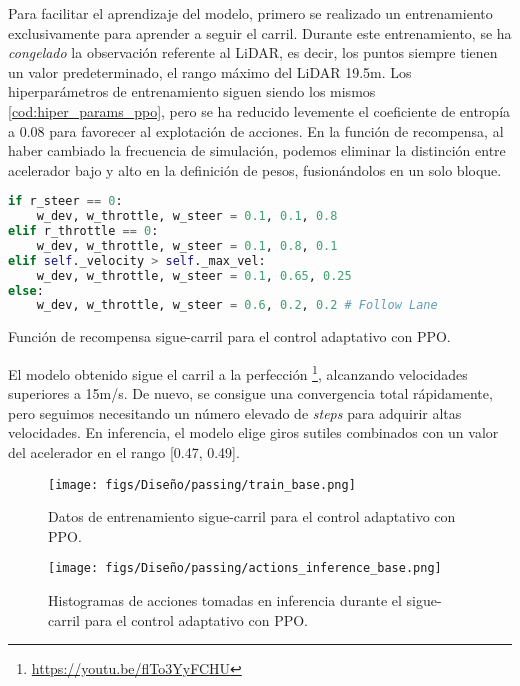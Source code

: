Para facilitar el aprendizaje del modelo, primero se realizado un entrenamiento exclusivamente para aprender a seguir el carril. Durante este entrenamiento, se ha \textit{congelado} la observación referente al \ac{LiDAR}, es decir, los puntos siempre tienen un valor predeterminado, el rango máximo del \ac{LiDAR} 19.5m. Los hiperparámetros de entrenamiento siguen siendo los mismos \ref{cod:hiper_params_ppo}, pero se ha reducido levemente el coeficiente de entropía a 0.08 para favorecer al explotación de acciones. En la función de recompensa, al haber cambiado la frecuencia de simulación, podemos eliminar la distinción entre acelerador bajo y alto en la definición de pesos, fusionándolos en un solo bloque.

\begin{code}[h]
\begin{lstlisting}[language=Python]
if r_steer == 0:
    w_dev, w_throttle, w_steer = 0.1, 0.1, 0.8
elif r_throttle == 0:
    w_dev, w_throttle, w_steer = 0.1, 0.8, 0.1
elif self._velocity > self._max_vel:
    w_dev, w_throttle, w_steer = 0.1, 0.65, 0.25
else:
    w_dev, w_throttle, w_steer = 0.6, 0.2, 0.2 # Follow Lane
\end{lstlisting}
\caption[Función de recompensa sigue-carril para el control adaptativo con \ac{PPO}]{Función de recompensa sigue-carril para el control adaptativo con \ac{PPO}.}
\label{cod:rew_carril_ppo_passing}
\end{code}

El modelo obtenido sigue el carril a la perfección \footnote{\url{https://youtu.be/flTo3YyFCHU}}, alcanzando velocidades superiores a 15m/s. De nuevo, se consigue una convergencia total rápidamente, pero seguimos necesitando un número elevado de \textit{steps} para adquirir altas velocidades. En inferencia, el modelo elige giros sutiles combinados con un valor del acelerador en el rango [0.47, 0.49].

\begin{figure}[ht]
  \centering
  \texttt{[image: figs/Diseño/passing/train\_base.png]}
  \caption{Datos de entrenamiento sigue-carril para el control adaptativo con \ac{PPO}.}
  \label{fig:passing_train_base}
\end{figure}

\begin{figure}[ht]
  \centering
  \texttt{[image: figs/Diseño/passing/actions\_inference\_base.png]}
  \caption{Histogramas de acciones tomadas en inferencia durante el sigue-carril para el control adaptativo con \ac{PPO}.}
  \label{fig:passing_actions_inf_base}
\end{figure}

